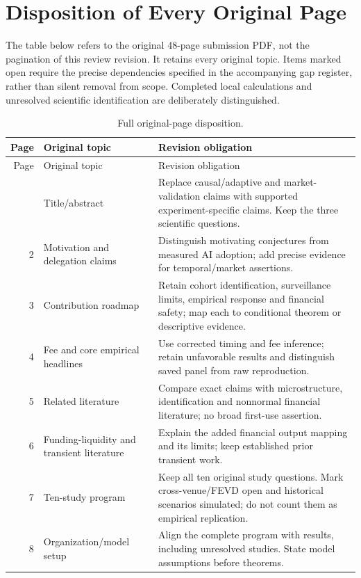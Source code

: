 \section{Disposition of Every Original Page}
The table below refers to the original 48-page submission PDF, not the pagination of this review revision. It retains every original topic. Items marked open require the precise dependencies specified in the accompanying gap register, rather than silent removal from scope. Completed local calculations and unresolved scientific identification are deliberately distinguished.
\begin{longtable}{rp{}p{}}
\caption{Full original-page disposition.}\\
\toprule Page & Original topic & Revision obligation\\\midrule\endfirsthead
\toprule Page & Original topic & Revision obligation\\\midrule\endhead
\bottomrule\endfoot
1 & Title/\allowbreak abstract & Replace causal/adaptive and market-validation claims with supported experiment-specific claims. Keep the three scientific questions.\\
2 & Motivation and delegation claims & Distinguish motivating conjectures from measured AI adoption; add precise evidence for temporal/market assertions.\\
3 & Contribution roadmap & Retain cohort identification, surveillance limits, empirical response and financial safety; map each to conditional theorem or descriptive evidence.\\
4 & Fee and core empirical headlines & Use corrected timing and fee inference; retain unfavorable results and distinguish saved panel from raw reproduction.\\
5 & Related literature & Compare exact claims with microstructure, identification and nonnormal financial literature; no broad first-use assertion.\\
6 & Funding-liquidity and transient literature & Explain the added financial output mapping and its limits; keep established prior transient work.\\
7 & Ten-study program & Keep all ten original study questions. Mark cross-venue/FEVD open and historical scenarios simulated; do not count them as empirical replication.\\
8 & Organization/\allowbreak model setup & Align the complete program with results, including unresolved studies. State model assumptions before theorems.\\

\end{longtable}
